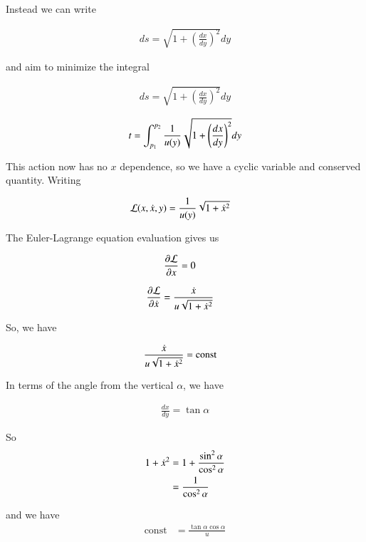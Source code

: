 Instead we can write

\begin{align*}
ds = \sqrt{1 + \left(\frac{dx}{dy}\right)^2} dy
\end{align*}

and aim to minimize the integral

\begin{align*}
ds = \sqrt{1 + \left(\frac{dx}{dy}\right)^2} dy
\end{align*}

\begin{align*}
t = \int_{p_1}^{p_2} \frac{1}{u(y)} \sqrt{1 + \left(\frac{dx}{dy}\right)^2} dy
\end{align*}

This action now has no $x$ dependence, so we have a cyclic variable and conserved quantity.  Writing

\begin{align*}
\mathcal{L}(x,\dot{x}, y) &= \frac{1}{u(y)} \sqrt{1 + \dot{x}^2} 
\end{align*}

The Euler-Lagrange equation evaluation gives us

\begin{align*}
\frac{\partial {\mathcal{L}}}{\partial {x}} &= 0
\end{align*}

\begin{align*}
\frac{\partial {\mathcal{L}}}{\partial {\dot{x}}} &= \frac{\dot{x}}{u \sqrt{1 + \dot{x}^2} }
\end{align*}

So, we have

\begin{align*}
\frac{\dot{x}}{u \sqrt{1 + \dot{x}^2} } &= \text{const}
\end{align*}

In terms of the angle from the vertical $\alpha$, we have

\begin{align*}
\frac{dx}{dy} = \tan\alpha 
\end{align*}

So
\begin{align*}
1 + \dot{x}^2 
&= 1 + \frac{\sin^2\alpha}{\cos^2\alpha} \\
&= \frac{1}{\cos^2\alpha} \\
\end{align*}

and we have
\begin{align*}
\text{const}
&= 
\frac{\tan\alpha \cos\alpha}{u}  \\
\end{align*}

